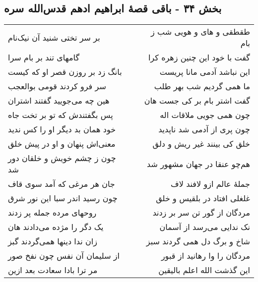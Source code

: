 \begin{center}
\section*{بخش ۳۴ - باقی قصهٔ ابراهیم ادهم قدس‌الله سره}
\label{sec:sh034}
\begin{longtable}{l p{0.5cm} r}
بر سر تختی شنید آن نیک‌نام
&&
طقطقی و های و هویی شب ز بام
\\
گامهای تند بر بام سرا
&&
گفت با خود این چنین زهره کرا
\\
بانگ زد بر روزن قصر او که کیست
&&
این نباشد آدمی مانا پریست
\\
سر فرو کردند قومی بوالعجب
&&
ما همی گردیم شب بهر طلب
\\
هین چه می‌جویید گفتند اشتران
&&
گفت اشتر بام بر کی جست هان
\\
پس بگفتندش که تو بر تخت جاه
&&
چون همی جویی ملاقات اله
\\
خود همان بد دیگر او را کس ندید
&&
چون پری از آدمی شد ناپدید
\\
معنی‌اش پنهان و او در پیش خلق
&&
خلق کی بینند غیر ریش و دلق
\\
چون ز چشم خویش و خلقان دور شد
&&
هم‌چو عنقا در جهان مشهور شد
\\
جان هر مرغی که آمد سوی قاف
&&
جملهٔ عالم ازو لافند لاف
\\
چون رسید اندر سبا این نور شرق
&&
غلغلی افتاد در بلقیس و خلق
\\
روحهای مرده جمله پر زدند
&&
مردگان از گور تن سر بر زدند
\\
یک دگر را مژده می‌دادند هان
&&
نک ندایی می‌رسد از آسمان
\\
زان ندا دینها همی‌گردند گبز
&&
شاخ و برگ دل همی گردند سبز
\\
از سلیمان آن نفس چون نفخ صور
&&
مردگان را وا رهانید از قبور
\\
مر ترا بادا سعادت بعد ازین
&&
این گذشت الله اعلم بالیقین
\\
\end{longtable}
\end{center}

